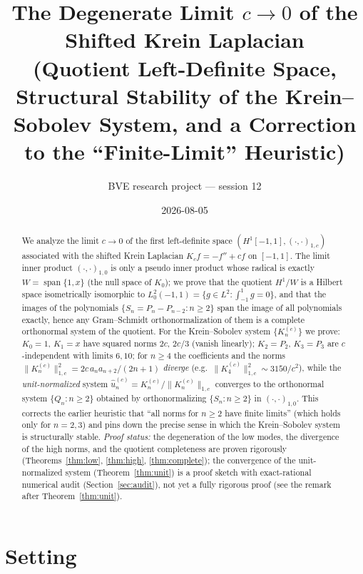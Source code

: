 ﻿\documentclass[11pt]{article}
\title{The Degenerate Limit $c\to 0$ of the Shifted Krein Laplacian\\ \large (Quotient Left-Definite Space, Structural Stability of the Krein--Sobolev System, and a Correction to the ``Finite-Limit'' Heuristic)}
\author{BVE research project --- session 12}
\date{2026-08-05}
\begin{document}
\maketitle

\begin{abstract}
We analyze the limit $c\to 0$ of the first left-definite space
$(H^1[-1,1],(\cdot,\cdot)_{1,c})$ associated with the shifted Krein Laplacian
$K_c f = -f''+cf$ on $[-1,1]$.  The limit inner product
$(\cdot,\cdot)_{1,0}$ is only a pseudo inner product whose radical is exactly
$W=\operatorname{span}\{1,x\}$ (the null space of $K_0$); we prove that the
quotient $H^1/W$ is a Hilbert space isometrically isomorphic to
$L^2_0(-1,1)=\{g\in L^2: \int_{-1}^1 g=0\}$, and that the images of the
polynomials $\{S_n=P_n-P_{n-2}: n\ge 2\}$ span the image of all polynomials
exactly, hence any Gram--Schmidt orthonormalization of them is a complete
orthonormal system of the quotient.  For the Krein--Sobolev system
$\{K_n^{(c)}\}$ we prove: $K_0=1$, $K_1=x$ have squared norms $2c$, $2c/3$
(vanish linearly); $K_2=P_2$, $K_3=P_3$ are $c$-independent with limits $6,10$;
for $n\ge 4$ the coefficients and the norms
$\|K_n^{(c)}\|_{1,c}^2=2c\,a_n a_{n+2}/(2n+1)$ \emph{diverge} (e.g.\
$\|K_4^{(c)}\|_{1,c}^2\sim 3150/c^2$), while the \emph{unit-normalized} system
$\widehat u_n^{(c)}=K_n^{(c)}/\|K_n^{(c)}\|_{1,c}$ converges to the
orthonormal system $\{Q_n:n\ge 2\}$ obtained by orthonormalizing
$\{S_n:n\ge 2\}$ in $(\cdot,\cdot)_{1,0}$.  This corrects the earlier
heuristic that ``all norms for $n\ge 2$ have finite limits'' (which holds only
for $n=2,3$) and pins down the precise sense in which the Krein--Sobolev
system is structurally stable.  \emph{Proof status:} the degeneration of
the low modes, the divergence of the high norms, and the quotient
completeness are proven rigorously (Theorems~\ref{thm:low},
\ref{thm:high}, \ref{thm:complete}); the convergence of the
unit-normalized system (Theorem~\ref{thm:unit}) is a proof sketch with
exact-rational numerical audit (Section~\ref{sec:audit}), not yet a fully
rigorous proof (see the remark after Theorem~\ref{thm:unit}).
\end{abstract}

\section{Setting}
\end{document}
